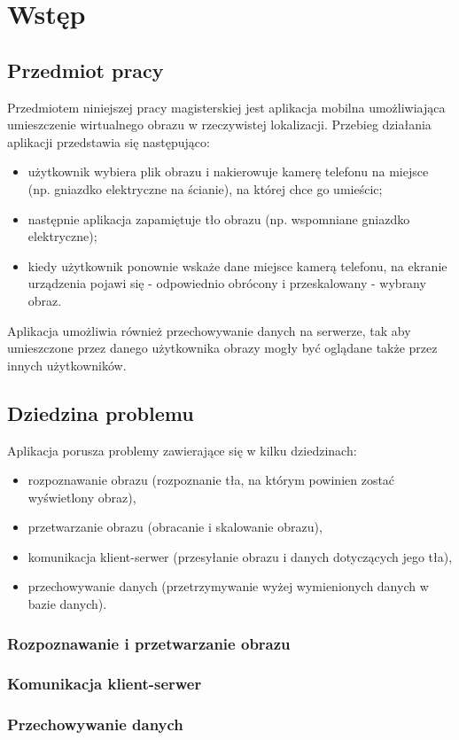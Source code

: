 \chapter{Wstęp}

\section{Przedmiot pracy}

Przedmiotem niniejszej pracy magisterskiej jest aplikacja mobilna umożliwiająca umieszczenie wirtualnego obrazu w rzeczywistej lokalizacji.
Przebieg działania aplikacji przedstawia się następująco:
\begin{itemize}
 \item użytkownik wybiera plik obrazu i nakierowuje kamerę telefonu na miejsce (np. gniazdko elektryczne na ścianie), na której chce go umieścic;
 \item następnie aplikacja zapamiętuje tło obrazu (np. wspomniane gniazdko elektryczne);
 \item kiedy użytkownik ponownie wskaże dane miejsce kamerą telefonu, na ekranie urządzenia pojawi się - odpowiednio obrócony i przeskalowany - wybrany obraz.
\end{itemize}

Aplikacja umożliwia również przechowywanie danych na serwerze, tak aby umieszczone przez danego użytkownika obrazy mogły być oglądane także przez innych użytkowników.



\section{Dziedzina problemu}
Aplikacja porusza problemy zawierające się w kilku dziedzinach:

\begin{itemize}
 \item rozpoznawanie obrazu (rozpoznanie tła, na którym powinien zostać wyświetlony obraz),
 \item przetwarzanie obrazu (obracanie i skalowanie obrazu),
 \item komunikacja klient-serwer (przesyłanie obrazu i danych dotyczących jego tła),
 \item przechowywanie danych (przetrzymywanie wyżej wymienionych danych w bazie danych).
\end{itemize}


\subsection{Rozpoznawanie i przetwarzanie obrazu}

\subsection{Komunikacja klient-serwer}

\subsection{Przechowywanie danych}